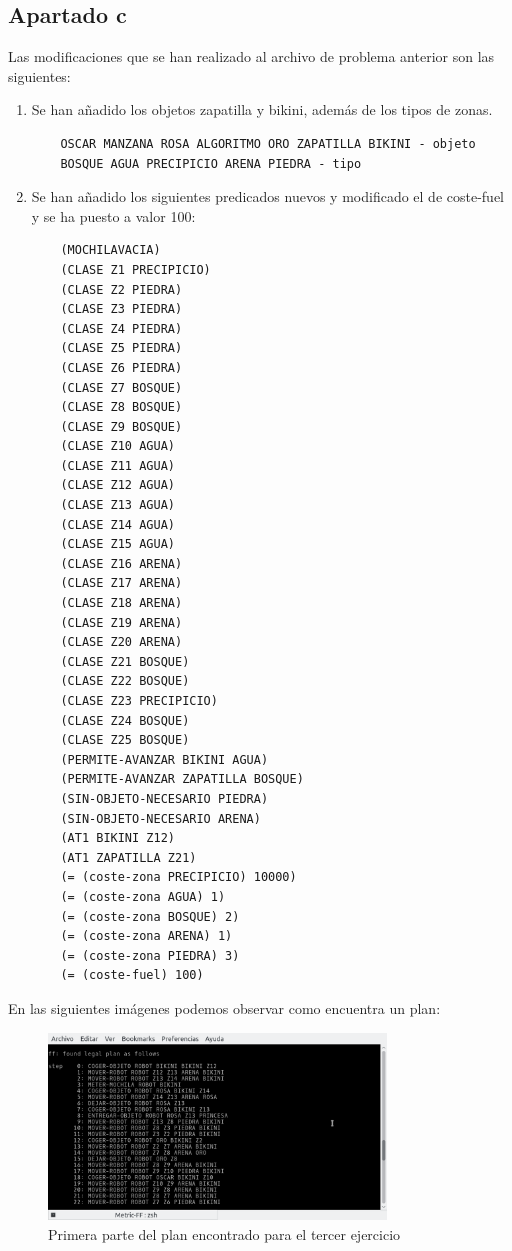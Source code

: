\subsection{Apartado c}
Las modificaciones que se han realizado al archivo de problema anterior son las siguientes:
\begin{enumerate}
	\item Se han añadido los objetos zapatilla y bikini, además de los tipos de zonas.
	\begin{verbatim}
	OSCAR MANZANA ROSA ALGORITMO ORO ZAPATILLA BIKINI - objeto
	BOSQUE AGUA PRECIPICIO ARENA PIEDRA - tipo
	\end{verbatim}
	\item Se han añadido los siguientes predicados nuevos y modificado el de coste-fuel y se ha puesto a valor 100:
	\begin{verbatim}
	(MOCHILAVACIA)
	(CLASE Z1 PRECIPICIO)
	(CLASE Z2 PIEDRA)
	(CLASE Z3 PIEDRA)
	(CLASE Z4 PIEDRA)
	(CLASE Z5 PIEDRA)
	(CLASE Z6 PIEDRA)
	(CLASE Z7 BOSQUE)
	(CLASE Z8 BOSQUE)
	(CLASE Z9 BOSQUE)
	(CLASE Z10 AGUA)
	(CLASE Z11 AGUA)
	(CLASE Z12 AGUA)
	(CLASE Z13 AGUA)
	(CLASE Z14 AGUA)
	(CLASE Z15 AGUA)
	(CLASE Z16 ARENA)
	(CLASE Z17 ARENA)
	(CLASE Z18 ARENA)
	(CLASE Z19 ARENA)
	(CLASE Z20 ARENA)
	(CLASE Z21 BOSQUE)
	(CLASE Z22 BOSQUE)
	(CLASE Z23 PRECIPICIO)
	(CLASE Z24 BOSQUE)
	(CLASE Z25 BOSQUE)
	(PERMITE-AVANZAR BIKINI AGUA)
	(PERMITE-AVANZAR ZAPATILLA BOSQUE)
	(SIN-OBJETO-NECESARIO PIEDRA)
	(SIN-OBJETO-NECESARIO ARENA)
	(AT1 BIKINI Z12)
	(AT1 ZAPATILLA Z21)
	(= (coste-zona PRECIPICIO) 10000)
	(= (coste-zona AGUA) 1)
	(= (coste-zona BOSQUE) 2)
	(= (coste-zona ARENA) 1)
	(= (coste-zona PIEDRA) 3)
	(= (coste-fuel) 100)
	\end{verbatim}
\end{enumerate}
En las siguientes imágenes podemos observar como encuentra un plan:
\begin{figure}[H]
	\centering
	\includegraphics[width=0.8\textwidth]{img5}
	\caption{Primera parte del plan encontrado para el tercer ejercicio}
\end{figure}
